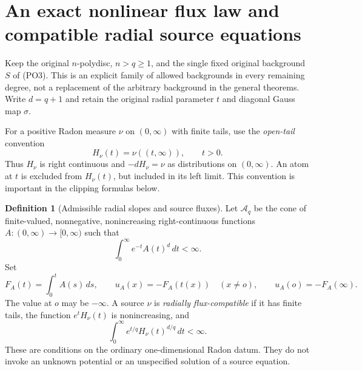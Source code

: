 \documentclass[11pt,a4paper]{article}
\numberwithin{equation}{section}
\theoremstyle{definition}
\newtheorem{definition}[theorem]{Definition}
\theoremstyle{remark}
\begin{document}


\section{An exact nonlinear flux law and compatible radial source equations}
\label{sec:r12-radial-flux-source-inversion}

Keep the original $n$-polydisc, $n>q\ge1$, and the single
fixed original background $S$ of \textup{(PO3)}.  This is
an explicit family of allowed backgrounds in every remaining
degree, not a replacement of the arbitrary background in the
general theorems.  Write $d=q+1$ and retain the original
radial parameter $t$ and diagonal Gauss map $\sigma$.

For a positive Radon measure $\nu$ on $(0,\infty)$ with
finite tails, use the \emph{open-tail} convention
\[
 H_\nu(t)=\nu((t,\infty)),\qquad t>0.
 \tag{RF1}
\]
Thus $H_\nu$ is right continuous and $-dH_\nu=\nu$
as distributions on $(0,\infty)$.  An atom at $t$ is
excluded from $H_\nu(t)$, but included in its left limit.
This convention is important in the clipping formulas below.

\begin{definition}[Admissible radial slopes and source fluxes]
\label{def:r12-radial-admissible-flux}
Let $\mathscr A_q$ be the cone of finite-valued,
nonnegative, nonincreasing right-continuous functions
$A:(0,\infty)\to[0,\infty)$ such that
\[
                 \int_0^\infty e^{-t}A(t)^d\,dt<\infty.
 \tag{RF2}
\]
Set
\[
 F_A(t)=\int_0^t A(s)\,ds,\qquad
 u_A(x)=-F_A(t(x))\quad(x\ne o),\qquad
 u_A(o)=-F_A(\infty).
 \tag{RF3}
\]
The value at $o$ may be $-\infty$.  A source $\nu$ is
\emph{radially flux-compatible} if it has finite tails,
the function $e^tH_\nu(t)$ is nonincreasing, and
\[
              \int_0^\infty e^{t/q}H_\nu(t)^{d/q}\,dt<\infty.
 \tag{RF4}
\]
These are conditions on the ordinary one-dimensional
Radon datum.  They do not invoke an unknown potential
or an unspecified solution of a source equation.
\end{definition}
\end{document}
